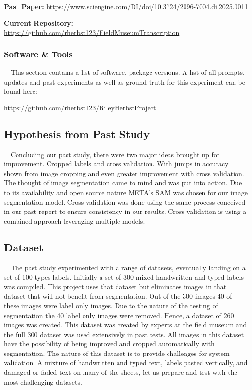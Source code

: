 \documentclass{article}
\begin{document}
\textbf{Past Paper:} \url{https://www.sciengine.com/DI/doi/10.3724/2096-7004.di.2025.0011}

\textbf{Current Repository:} \url{https://github.com/rherbst123/FieldMuseumTranscription}

\subsubsection*{Software \& Tools}
$\quad$This section contains a list of software, package versions. A list of all prompts, updates and past experiments as well as ground truth for this experiment can be found here: 

\url{https://github.com/rherbst123/RileyHerbstProject}

\subsection{Hypothesis from Past Study}
$\quad$Concluding our past study, there were two major ideas brought up for improvement. Cropped labels and cross validation. With jumps in accuracy shown from image cropping and even greater improvement with cross validation. The thought of image segmentation came to mind and was put into action. Due to its availability and open source nature META's SAM was chosen for our image segmentation model. Cross validation was done using the same process conceived in our past report to ensure consistency in our results. Cross validation is using a combined approach leveraging multiple models. 

\subsection{Dataset}
$\quad$The past study experimented with a range of datasets, eventually landing on a set of 100 types labels. Initially a set of 300 mixed handwritten and typed labels was compiled. This project uses that dataset but eliminates images in that dataset that will not benefit from segmentation. Out of the 300 images 40 of these images were label only images. Due to the nature of the testing of segmentation the 40 label only images were removed. Hence, a dataset of 260 images was created. This dataset was created by experts at the field museum and the full 300 dataset was used extensively in past tests. All images in this dataset have the possibility of being improved and cropped automatically with segmentation. The nature of this dataset is to provide challenges for system validation. A mixture of handwritten and typed text, labels pasted vertically, and damaged or faded text on many of the sheets, let us prepare and test with the most challenging datasets.
\end{document}
